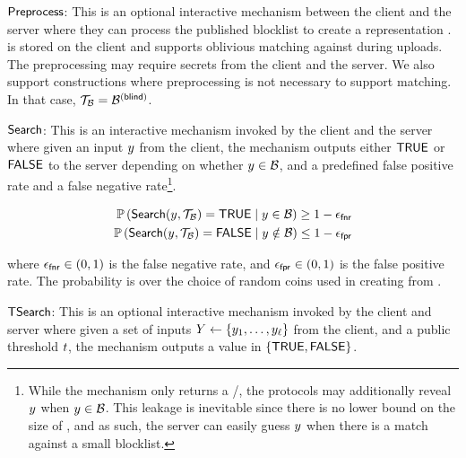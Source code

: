 \itemListEnd
  
\item $ \mathsf{Preprocess}$: This is an optional interactive mechanism between the client and the server where they can process the published blocklist to create a representation \blklistToken. 
\blklistToken is stored on the client and supports oblivious matching against \blocklist during uploads. The preprocessing may require secrets from the client and the server. We also support constructions where preprocessing is not necessary to support matching. In that case, $\blklistToken = \blindedBlocklist$. 


\item $\mathsf{Search}$: This is an interactive mechanism invoked by the client and the server where given an input $\genericCInputElmt$ from the client, the mechanism outputs either $\mathsf{TRUE}$ or $\mathsf{FALSE}$ to the server depending on whether $\genericCInputElmt \in \blocklist$, and a predefined false positive rate and a false negative rate\footnote{While the mechanism only  returns a \tru/\fals, the protocols may additionally reveal $\genericCInputElmt$ when $\genericCInputElmt \in \blocklist$. This leakage is inevitable since there is no lower bound on the size of \blocklist, and as such, the server can easily guess $\genericCInputElmt$ when there is a match against a small blocklist.}. 

\begin{align*}
\cprob{}{\searchBlocklist(\genericCInputElmt, \blklistToken) = \tru}{\genericCInputElmt \in \blocklist} \ge 1 - \fnr\\
\cprob{}{\searchBlocklist(\genericCInputElmt, \blklistToken) = \fals}{\genericCInputElmt \notin \blocklist} \le 1 - \fpr 
\end{align*}

where $\epsilon_\mathsf{fnr} \in (0,1)$ is the false negative rate, and $\epsilon_\mathsf{fpr} \in (0,1)$ is the false positive rate. The probability is over the choice of random coins used in creating \blklistToken from \blocklist. 

%



\item $\mathsf{TSearch}$: This is an optional interactive mechanism invoked by the client and server where given a set of inputs $\genericCInputSet \assign \{ \genericCInputElmt{1}, \dots, \genericCInputElmt{\genericVecLen} \}$ from the client, and a public threshold $t$, the mechanism outputs a value in $\{\mathsf{TRUE},\mathsf{FALSE}\}$.


